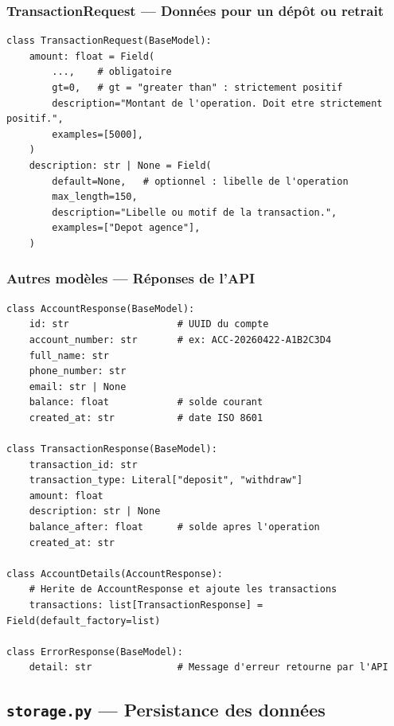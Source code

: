 \documentclass[12pt,a4paper]{article}
\begin{document}
\subsubsection{TransactionRequest — Données pour un dépôt ou retrait}

\begin{lstlisting}[style=python, caption={models.py — TransactionRequest}]
class TransactionRequest(BaseModel):
    amount: float = Field(
        ...,    # obligatoire
        gt=0,   # gt = "greater than" : strictement positif
        description="Montant de l'operation. Doit etre strictement positif.",
        examples=[5000],
    )
    description: str | None = Field(
        default=None,   # optionnel : libelle de l'operation
        max_length=150,
        description="Libelle ou motif de la transaction.",
        examples=["Depot agence"],
    )
\end{lstlisting}

\subsubsection{Autres modèles — Réponses de l'API}

\begin{lstlisting}[style=python, caption={models.py — Modeles de reponse}]
class AccountResponse(BaseModel):
    id: str                   # UUID du compte
    account_number: str       # ex: ACC-20260422-A1B2C3D4
    full_name: str
    phone_number: str
    email: str | None
    balance: float            # solde courant
    created_at: str           # date ISO 8601

class TransactionResponse(BaseModel):
    transaction_id: str
    transaction_type: Literal["deposit", "withdraw"]
    amount: float
    description: str | None
    balance_after: float      # solde apres l'operation
    created_at: str

class AccountDetails(AccountResponse):
    # Herite de AccountResponse et ajoute les transactions
    transactions: list[TransactionResponse] = Field(default_factory=list)

class ErrorResponse(BaseModel):
    detail: str               # Message d'erreur retourne par l'API
\end{lstlisting}

\subsection{\texttt{storage.py} — Persistance des données}
\end{document}
